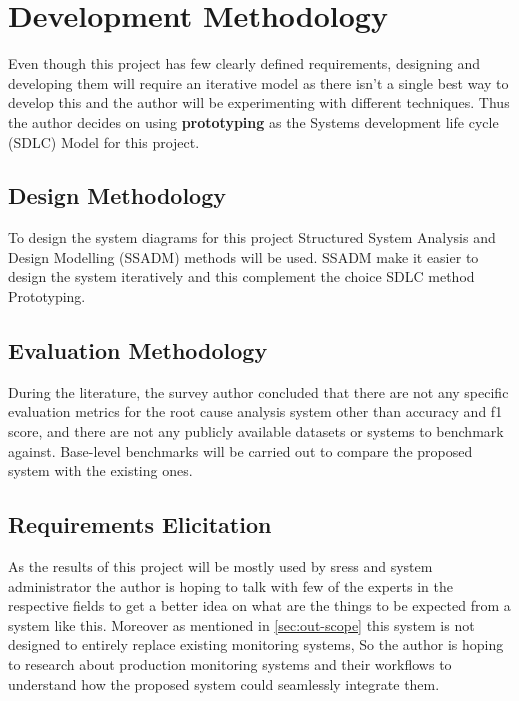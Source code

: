 \section{Development Methodology}

Even though this project has few clearly defined requirements, designing and developing them will require an iterative model as there isn't a single best way to develop this and the author will be experimenting with different techniques. Thus the author decides on using \textbf{prototyping} as the Systems development life cycle (SDLC) Model for this project.\\

\subsection{Design Methodology}

To design the system diagrams for this project Structured System Analysis and Design Modelling (SSADM) methods will be used. SSADM make it easier to design the system iteratively and this complement the choice SDLC method Prototyping.

\subsection{Evaluation Methodology}

During the literature, the survey author concluded that there are not any specific evaluation metrics for the root cause analysis system other than accuracy and f1 score, and there are not any publicly available datasets or systems to benchmark against. Base-level benchmarks will be carried out to compare the proposed system with the existing ones. 

\subsection{Requirements Elicitation}

As the results of this project will be mostly used by \acp{sres} and system administrator the author is hoping to talk with few of the experts in the respective fields to get a better idea on what are the things to be expected from a system like this. Moreover as mentioned in \ref{sec:out-scope} this system is not designed to entirely replace existing monitoring systems, So the author is hoping to research about production monitoring systems and their workflows to understand how the proposed system could seamlessly integrate them. 
